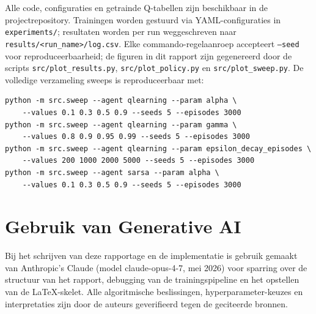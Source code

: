 \documentclass[11pt,a4paper]{article}
\begin{document}
Alle code, configuraties en getrainde Q-tabellen zijn beschikbaar in de
projectrepository. Trainingen worden gestuurd via YAML-configuraties in
\texttt{experiments/}; resultaten worden per run weggeschreven naar
\texttt{results/<run\_name>/log.csv}. Elke commando-regelaanroep
accepteert \texttt{--seed} voor reproduceerbaarheid; de figuren in dit
rapport zijn gegenereerd door de scripts \texttt{src/plot\_results.py},
\texttt{src/plot\_policy.py} en \texttt{src/plot\_sweep.py}. De volledige
verzameling sweeps is reproduceerbaar met:

\begin{verbatim}
python -m src.sweep --agent qlearning --param alpha \
    --values 0.1 0.3 0.5 0.9 --seeds 5 --episodes 3000
python -m src.sweep --agent qlearning --param gamma \
    --values 0.8 0.9 0.95 0.99 --seeds 5 --episodes 3000
python -m src.sweep --agent qlearning --param epsilon_decay_episodes \
    --values 200 1000 2000 5000 --seeds 5 --episodes 3000
python -m src.sweep --agent sarsa --param alpha \
    --values 0.1 0.3 0.5 0.9 --seeds 5 --episodes 3000
\end{verbatim}

\section*{Gebruik van Generative AI}

Bij het schrijven van deze rapportage en de implementatie is gebruik
gemaakt van Anthropic's Claude (model claude-opus-4-7, mei 2026) voor
sparring over de structuur van het rapport, debugging van de
trainings\-pipeline en het opstellen van de LaTeX-skelet. Alle
algoritmische beslissingen, hyperparameter-keuzes en interpretaties
zijn door de auteurs geverifieerd tegen de geciteerde bronnen.
\end{document}

